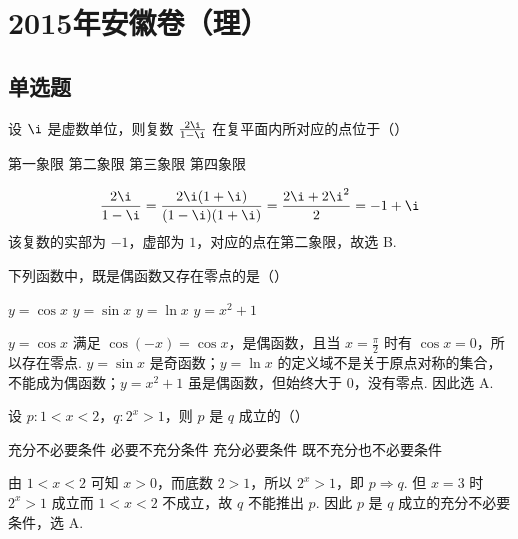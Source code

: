 \chapter{2015年安徽卷（理）}

\section{单选题}

\begin{problem}
设 \(\i\) 是虚数单位，则复数 \(\frac{2\i}{1 - \i}\) 在复平面内所对应的点位于（\quad）

\choices
    {第一象限}
    {第二象限}
    {第三象限}
    {第四象限}

\begin{solution}
\[
\frac{2\i}{1-\i}=\frac{2\i(1+\i)}{(1-\i)(1+\i)}=\frac{2\i+2\i^2}{2}=-1+\i
\]
该复数的实部为 \(-1\)，虚部为 \(1\)，对应的点在第二象限，故选 B.
\end{solution}
\end{problem}

\begin{problem}
下列函数中，既是偶函数又存在零点的是（\quad）

\choices
    {\(y = \cos x\)}
    {\(y = \sin x\)}
    {\(y = \ln x\)}
    {\(y = x^{2} + 1\)}

\begin{solution}
\(y=\cos x\) 满足 \(\cos(-x)=\cos x\)，是偶函数，且当 \(x=\frac{\pi}{2}\) 时有 \(\cos x=0\)，所以存在零点. \(y=\sin x\) 是奇函数；\(y=\ln x\) 的定义域不是关于原点对称的集合，不能成为偶函数；\(y=x^2+1\) 虽是偶函数，但始终大于 \(0\)，没有零点. 因此选 A.
\end{solution}
\end{problem}

\begin{problem}
设 \(p: 1 < x < 2\)，\(q: 2^x > 1\)，则 \(p\) 是 \(q\) 成立的（\quad）

\choices
    {充分不必要条件}
    {必要不充分条件}
    {充分必要条件}
    {既不充分也不必要条件}

\begin{solution}
由 \(1<x<2\) 可知 \(x>0\)，而底数 \(2>1\)，所以 \(2^x>1\)，即 \(p\Rightarrow q\). 但 \(x=3\) 时 \(2^x>1\) 成立而 \(1<x<2\) 不成立，故 \(q\) 不能推出 \(p\). 因此 \(p\) 是 \(q\) 成立的充分不必要条件，选 A.
\end{solution}
\end{problem}

